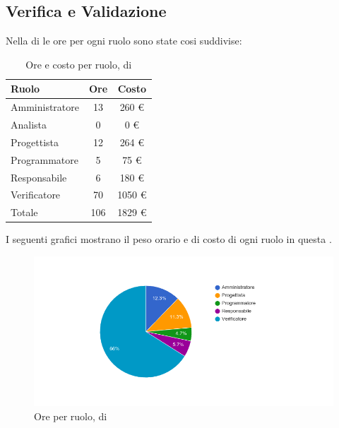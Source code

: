 \subsection{Verifica e Validazione}
Nella  di  le ore per ogni ruolo sono state cosi suddivise:

\begin{table}[H]
	\centering
	\begin{tabular}{ l c c }
		\textbf{Ruolo} & \textbf{Ore} & \textbf{Costo} \\
		\hline
		Amministratore & 13 & 260 \euro{} \\
		Analista & 0 & 0 \euro{} \\
		Progettista & 12 & 264 \euro{} \\
		Programmatore & 5 & 75 \euro{} \\
		Responsabile & 6 & 180 \euro{} \\
		Verificatore & 70 & 1050 \euro{} \\
		\hline
		Totale & 106 & 1829 \euro{} \\
		\hline
	\end{tabular}
	\caption{Ore e costo per ruolo,  di }
\end{table}

I seguenti grafici mostrano il peso orario e di costo di ogni ruolo in questa .

\begin{figure}[H]
  \begin{center}
    \includegraphics[width=15cm]{res/img/prospettoEconomico/orePerRuoloValidazione.png}
  \caption{Ore per ruolo,  di }
  \end{center} 
\end{figure}  


